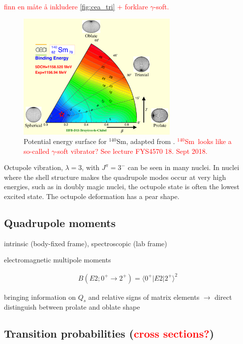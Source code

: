 \documentclass[twoside,english]{uiofysmaster/uiofysmaster}
\newcommand{\Sm}{$^{140}$Sm} %
\newcommand{\ga}{$\gamma$}
\let\orgautoref\autoref
\renewcommand{\autoref}
        {%
		 \def\sectionautorefname{Section}%
		 \def\subsectionautorefname{Section}%
		 \def\subsubsectionautorefname{Section}%
		 \def\chapterautorefname{Chapter}%
          \orgautoref}
\begin{document}
\textcolor{red}{finn en måte å inkludere \autoref{fig:cea_tri} + forklare \ga-soft.}

\begin{figure}[ht]
	\centering
	\includegraphics[width=0.7\textwidth]{Images/Triaxial-map-drawing.png}
	\caption{Potential energy surface for \Sm, adapted from \cite{Hilaire2007, CEA}. \textcolor{red}{\Sm\ looks like a so-called \ga-soft vibrator? See lecture FYS4570 18. Sept 2018.}}
	\label{fig:cea_tri}
\end{figure}

Octupole vibration, $\lambda = 3$, with $J^\pi = 3^-$ can be seen in many nuclei.
In nuclei where the shell structure makes the quadrupole modes occur at very high energies, such as in doubly magic nuclei, the octupole state is often the lowest excited state.
The octupole deformation has a pear shape.







\subsection{Quadrupole moments}

intrinsic (body-fixed frame), spectroscopic (lab frame)

electromagnetic multipole moments

\begin{align}
	B(E2; 0^+ \rightarrow 2^+) = \langle 0^+| E2 | 2^+ \rangle^2
\end{align}

bringing information on $Q_s$ and relative signs of matrix elements $\rightarrow$ direct distinguish between prolate and oblate shape

\subsection{Transition probabilities (\textcolor{red}{cross sections?})}
\end{document}
